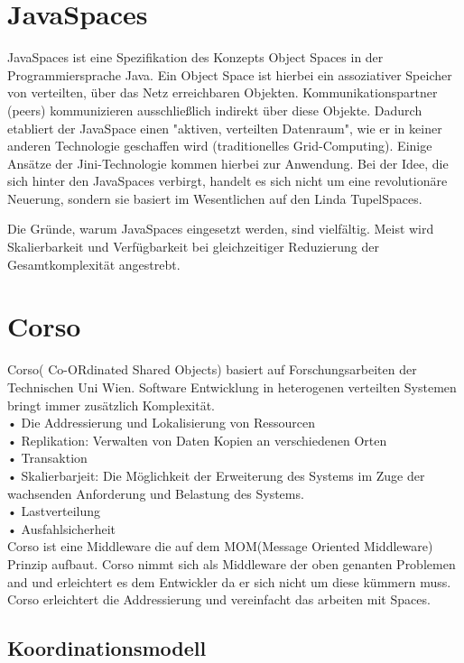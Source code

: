 \documentclass[a4paper,12pt]{scrreprt}
\begin{document}
	\section{JavaSpaces}
		JavaSpaces ist eine Spezifikation des Konzepts Object Spaces in der Programmiersprache Java. Ein Object Space ist hierbei ein assoziativer Speicher von verteilten, über das Netz erreichbaren Objekten. Kommunikationspartner (peers) kommunizieren ausschließlich indirekt über diese Objekte. Dadurch etabliert der JavaSpace einen "aktiven, verteilten Datenraum", wie er in keiner anderen Technologie geschaffen wird (traditionelles Grid-Computing). Einige Ansätze der Jini-Technologie kommen hierbei zur Anwendung. Bei der Idee, die sich hinter den JavaSpaces verbirgt, handelt es sich nicht um eine revolutionäre Neuerung, sondern sie basiert im Wesentlichen auf den Linda TupelSpaces.
		
		Die Gründe, warum JavaSpaces eingesetzt werden, sind vielfältig. Meist wird Skalierbarkeit und Verfügbarkeit bei gleichzeitiger Reduzierung der Gesamtkomplexität angestrebt.
		
		
		\section{Corso}
			Corso( Co-ORdinated Shared Objects) basiert auf Forschungsarbeiten der Technischen Uni Wien.
			Software Entwicklung in heterogenen verteilten Systemen bringt immer zusätzlich Komplexität.\\
			•	Die Addressierung und Lokalisierung von Ressourcen\\
			•	Replikation: Verwalten von Daten Kopien an verschiedenen Orten\\
			•	Transaktion\\
			•	Skalierbarjeit: Die Möglichkeit der Erweiterung des Systems im Zuge der wachsenden Anforderung und Belastung des Systems.\\
			•	Lastverteilung\\
			•	Ausfahlsicherheit\\
			Corso ist eine Middleware die auf dem MOM(Message Oriented Middleware) Prinzip aufbaut. Corso nimmt sich als Middleware der oben genanten Problemen and und erleichtert es dem Entwickler da er sich nicht um diese kümmern muss. Corso erleichtert die Addressierung und vereinfacht das arbeiten mit Spaces.\\
			
			\subsection{Koordinationsmodell}
			
\end{document}
